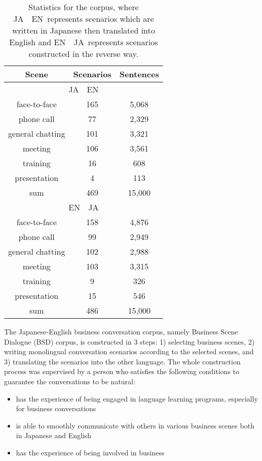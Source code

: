 \documentclass[11pt,a4paper]{article}
\newcommand*{\enja}{EN~~JA}
\newcommand*{\jaen}{JA~~EN}
\begin{document}
\begin{table}[t]
    \centering
    \begin{small}
    \begin{tabular}{|c|c|c|} 
         \hline
         Scene & Scenarios & Sentences \\ 
         \hline \hline
         \multicolumn{3}{|c|}{\jaen} \\ \hline
         face-to-face       & 165   & 5,068 \\ 
         phone call         & 77    & 2,329 \\
         general chatting   & 101   & 3,321 \\
         meeting            & 106   & 3,561 \\
         training           & 16    & 608 \\
         presentation       & 4     & 113 \\ 
         \hline
         sum                & 469   & 15,000 \\
         \hline \hline
         \multicolumn{3}{|c|}{\enja} \\ \hline
         face-to-face       & 158   & 4,876 \\ 
         phone call         & 99    & 2,949 \\
         general chatting   & 102   & 2,988 \\
         meeting            & 103   & 3,315 \\
         training           & 9     & 326 \\
         presentation       & 15    & 546 \\
         \hline
         sum                & 486   & 15,000 \\
         \hline
    \end{tabular}
    \end{small}
    \caption{Statistics for the corpus, where \jaen\ represents scenarios which are written in Japanese then translated into English
    and \enja\ represents scenarios constructed in the reverse way.}
    \label{table:overview}
\end{table}


The Japanese-English business conversation corpus, namely Business Scene Dialogue (BSD) corpus, is constructed in 3 steps: 1) selecting business scenes, 2) writing monolingual conversation scenarios according to the selected scenes, and 3) translating the scenarios into the other language. The whole construction process was supervised by a person who satisfies the following conditions to guarantee the conversations to be natural:
\begin{itemize}
    \item has the experience of being engaged in language learning programs, especially for business conversations
    \item is able to smoothly communicate with others in various business scenes both in Japanese and English
    \item has the experience of being involved in business
\end{itemize}
\end{document}
